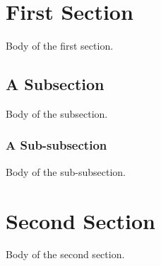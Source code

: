 \documentclass{article}
\begin{document}
\section{First Section}

Body of the first section.

\subsection{A Subsection}

Body of the subsection.

\subsubsection{A Sub-subsection}

Body of the sub-subsection.

\section{Second Section}

Body of the second section.
\end{document}
